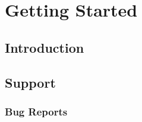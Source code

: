 \part{Getting Started}
\label{part:gettingstarted}
{
\hypersetup{linkcolor=black}
\parttoc
}

\chapter{Introduction}
\label{chapter:introduction}


\chapter{Support}
\label{chapter:support}


\section{Bug Reports}
\label{section:bugreports}


